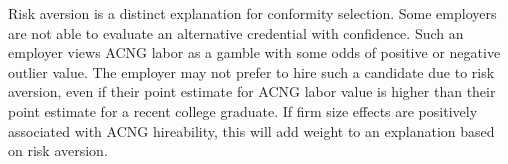 \documentclass[review]{elsarticle}
\begin{document}

Risk aversion is a distinct explanation for conformity selection.
Some employers are not able to evaluate an alternative credential with confidence.
Such an employer views ACNG labor as a gamble with some odds of positive or negative outlier value.
The employer may not prefer to hire such a candidate due to risk aversion,
even if their point estimate for ACNG labor value is higher than their point estimate for a recent college graduate.
If firm size effects are positively associated with ACNG hireability, this will add weight to an explanation based on risk aversion.
\end{document}
